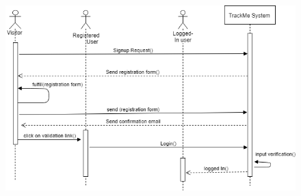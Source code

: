 \begin{figure}[H]
    \centering
    \includegraphics[scale=0.4]{rasdL/Pictures/login1.png}
    
\end{figure}
